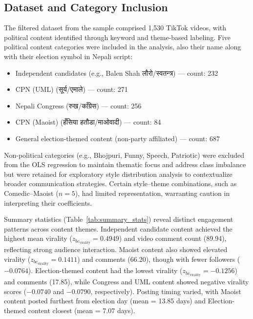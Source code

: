 \documentclass[12pt,a4paper]{report}
\begin{document}
\subsection{Dataset and Category Inclusion}
The filtered dataset from the sample comprised 1,530 TikTok videos, with political content identified through keyword and theme-based labeling. Five political content categories were included in the analysis, also their name along with their election symbol in Nepali script:
\begin{itemize}[noitemsep]
    \item Independent candidates (e.g., Balen Shah \texthindi{लौरो/स्वतन्त्र}) — count: 232
    \item CPN (UML) (\texthindi{सूर्य/एमाले}) — count: 271
    \item Nepali Congress (\texthindi{रुख/काँग्रेस}) — count: 256
    \item CPN (Maoist) (\texthindi{हँसिया हतौडा/माओवादी}) — count: 84
    \item General election-themed content (non-party affiliated) — count: 687
\end{itemize}
\newpage
Non-political categories (e.g., Bhojpuri, Funny, Speech, Patriotic) were excluded from the OLS regression to maintain thematic focus and address class imbalance but were retained for exploratory style distribution analysis to contextualize broader communication strategies. Certain style--theme combinations, such as Comedic--Maoist (\( n = 5 \)), had limited representation, warranting caution in interpreting their coefficients.

Summary statistics (Table~\ref{tab:summary_stats}) reveal distinct engagement patterns across content themes. Independent candidate content achieved the highest mean virality ($z_{bc_{\text{virality}}} = 0.4949$) and video comment count (89.94), reflecting strong audience interaction. Maoist content also showed elevated virality ($z_{bc_{\text{virality}}} = 0.1411$) and comments (66.20), though with fewer followers ($-0.0764$). Election-themed content had the lowest virality ($z_{bc_{\text{virality}}} = -0.1256$) and comments (17.85), while Congress and UML content showed negative virality scores ($-0.0740$ and $-0.0790$, respectively). Posting timing varied, with Maoist content posted furthest from election day (mean = 13.85 days) and Election-themed content closest (mean = 7.07 days).
\end{document}
